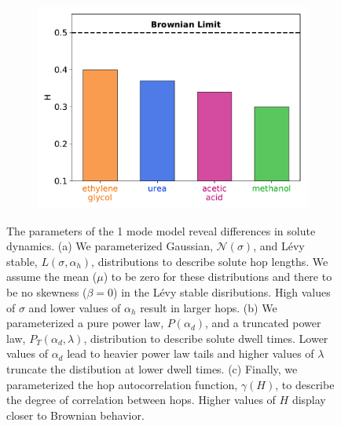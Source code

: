 \documentclass{article}
\begin{document}
\begin{figure}
\begin{subfigure}{0.325\textwidth}
  \includegraphics[width=\textwidth]{hurst_barchart.pdf}
  \caption{}\label{fig:hurst_barchart}
  \end{subfigure}
  \caption{The parameters of the 1 mode model reveal differences in solute dynamics.
  (a) We parameterized Gaussian, $\mathcal{N}(\sigma)$, and L\'evy stable, 
  $L(\sigma, \alpha_h)$, distributions to describe solute hop lengths. We assume the 
  mean ($\mu$) to be zero for these distributions and there to be no skewness ($\beta = 0$)
  in the L\'evy stable disributions. High values of $\sigma$ and lower values of $\alpha_h$
  result in larger hops. (b) We parameterized a pure power law, $P(\alpha_d)$, and a 
  truncated power law, $P_T(\alpha_d, \lambda)$, distribution to describe solute dwell
  times. Lower values of $\alpha_d$ lead to heavier power law tails and higher values of 
  $\lambda$ truncate the distibution at lower dwell times. (c) Finally, we parameterized the
  hop autocorrelation function, $\gamma(H)$, to describe the degree of correlation between
  hops. Higher values of $H$ display closer to Brownian behavior.}\label{fig:1mode_parameters}
  \end{figure}
  
\end{document}
